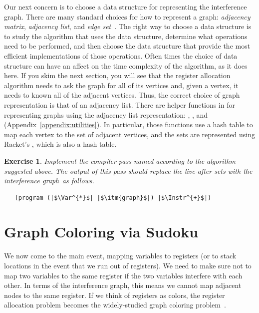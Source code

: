 \documentclass[11pt]{book}
\newtheorem{exercise}[theorem]{Exercise}
\begin{document}
Our next concern is to choose a data structure for representing the
interference graph. There are many standard choices for how to
represent a graph: \emph{adjacency matrix}, \emph{adjacency list}, and
\emph{edge set}~\citep{Cormen:2001uq}. The right way to choose a data
structure is to study the algorithm that uses the data structure,
determine what operations need to be performed, and then choose the
data structure that provide the most efficient implementations of
those operations. Often times the choice of data structure can have an
affect on the time complexity of the algorithm, as it does here. If
you skim the next section, you will see that the register allocation
algorithm needs to ask the graph for all of its vertices and, given a
vertex, it needs to known all of the adjacent vertices. Thus, the
correct choice of graph representation is that of an adjacency
list. There are helper functions in  for
representing graphs using the adjacency list representation:
, , and 
(Appendix~\ref{appendix:utilities}).  In particular, those functions
use a hash table to map each vertex to the set of adjacent vertices,
and the sets are represented using Racket's , which is also a
hash table.

\begin{exercise}\normalfont
Implement the compiler pass named  according
to the algorithm suggested above.  The output of this pass should
replace the live-after sets with the interference $\mathit{graph}$ as
follows.
\begin{lstlisting}
   (program (|$\Var^{*}$| |$\itm{graph}$|) |$\Instr^{+}$|)
\end{lstlisting}

\end{exercise}

\section{Graph Coloring via Sudoku}

We now come to the main event, mapping variables to registers (or to
stack locations in the event that we run out of registers).  We need
to make sure not to map two variables to the same register if the two
variables interfere with each other.  In terms of the interference
graph, this means we cannot map adjacent nodes to the same register.
If we think of registers as colors, the register allocation problem
becomes the widely-studied graph coloring
problem~\citep{Balakrishnan:1996ve,Rosen:2002bh}.  
\end{document}

